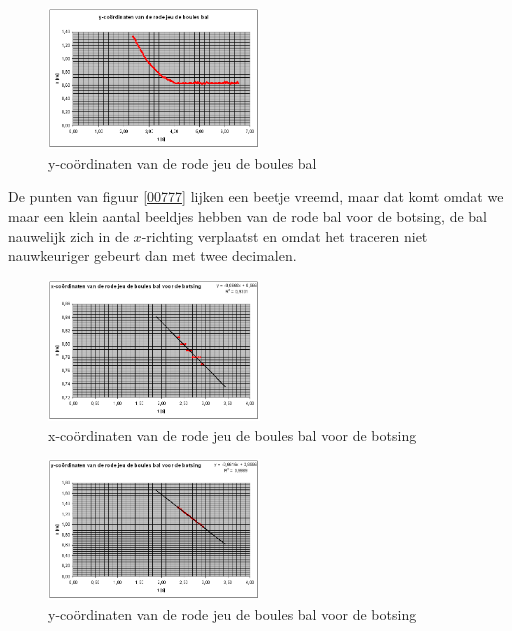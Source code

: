 \documentclass[12pt,a4paper]{article}
\begin{document}
	\begin{figure}[h]
		\centerline{\includegraphics[width=0.5\textwidth]{Plaatjes/00776.png}}
		\caption{y-co\"{o}rdinaten van de rode jeu de boules bal}
		\label{00776}
	\end{figure}
	
	De punten van figuur \eqref{00777} lijken een beetje vreemd, maar dat komt omdat we maar een klein aantal beeldjes hebben van de rode bal voor de botsing, de bal nauwelijk zich in de $x$-richting verplaatst en omdat het traceren niet nauwkeuriger gebeurt dan met twee decimalen.
	
	\begin{figure}[h]
		\centerline{\includegraphics[width=0.5\textwidth]{Plaatjes/00777.png}}
		\caption{x-co\"{o}rdinaten van de rode jeu de boules bal voor de botsing}
		\label{00777}
	\end{figure}
	
	\begin{figure}[h]
		\centerline{\includegraphics[width=0.5\textwidth]{Plaatjes/00778.png}}
		\caption{y-co\"{o}rdinaten van de rode jeu de boules bal voor de botsing}
		\label{00778}
	\end{figure}
	
\end{document}
